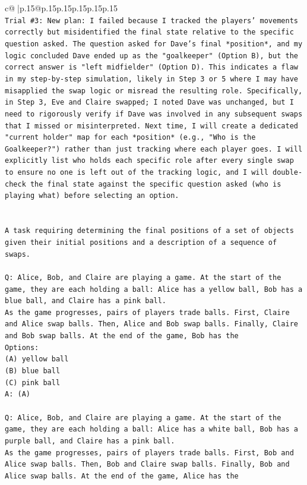 \documentclass{article}
\begin{document}
{\begin{supertabular}{c@{$\;$}|p{.15\linewidth}@{}p{.15\linewidth}p{.15\linewidth}p{.15\linewidth}p{.15\linewidth}p{.15\linewidth}}
{{{\\ 
\texttt{Trial \#3: New plan: I failed because I tracked the players' movements correctly but misidentified the final state relative to the specific question asked. The question asked for Dave's final *position*, and my logic concluded Dave ended up as the "goalkeeper" (Option B), but the correct answer is "left midfielder" (Option D). This indicates a flaw in my step{-}by{-}step simulation, likely in Step 3 or 5 where I may have misapplied the swap logic or misread the resulting role. Specifically, in Step 3, Eve and Claire swapped; I noted Dave was unchanged, but I need to rigorously verify if Dave was involved in any subsequent swaps that I missed or misinterpreted. Next time, I will create a dedicated "current holder" map for each *position* (e.g., "Who is the Goalkeeper?") rather than just tracking where each player goes. I will explicitly list who holds each specific role after every single swap to ensure no one is left out of the tracking logic, and I will double{-}check the final state against the specific question asked (who is playing what) before selecting an option.} \\
\\ 
\\ 
\texttt{A task requiring determining the final positions of a set of objects given their initial positions and a description of a sequence of swaps.} \\
\\ 
\texttt{Q: Alice, Bob, and Claire are playing a game. At the start of the game, they are each holding a ball: Alice has a yellow ball, Bob has a blue ball, and Claire has a pink ball.} \\
\texttt{As the game progresses, pairs of players trade balls. First, Claire and Alice swap balls. Then, Alice and Bob swap balls. Finally, Claire and Bob swap balls. At the end of the game, Bob has the} \\
\texttt{Options:} \\
\texttt{(A) yellow ball} \\
\texttt{(B) blue ball} \\
\texttt{(C) pink ball} \\
\texttt{A: (A)} \\
\\ 
\texttt{Q: Alice, Bob, and Claire are playing a game. At the start of the game, they are each holding a ball: Alice has a white ball, Bob has a purple ball, and Claire has a pink ball.} \\
\texttt{As the game progresses, pairs of players trade balls. First, Bob and Alice swap balls. Then, Bob and Claire swap balls. Finally, Bob and Alice swap balls. At the end of the game, Alice has the} \\
}}}
\end{supertabular}}
\end{document}
